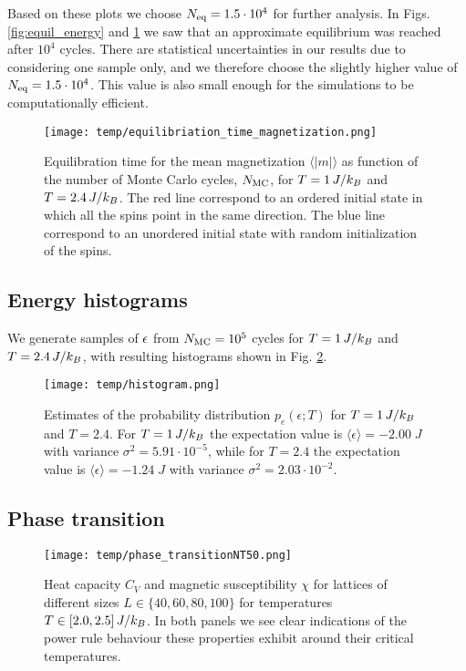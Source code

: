 Based on these plots we choose $N_\mathrm{eq}=1.5\cdot10^4$ for further analysis. In Figs. \ref{fig:equil_energy} and \ref{fig:equil_magn} we saw that an approximate equilibrium was reached after $10^4$ cycles. There are statistical uncertainties in our results due to considering one sample only, and we therefore choose the slightly higher value of $N_\mathrm{eq}=1.5\cdot10^4$. This value is also small enough for the simulations to be computationally efficient.

\begin{figure}[!ht]
    \texttt{[image: temp/equilibriation\_time\_magnetization.png]}
    \caption{Equilibration time for the mean magnetization $\langle \vert m \vert \rangle$ as function of the number of Monte Carlo cycles, $N_\mathrm{MC}$, for $T=1\,J/k_B$ and $T=2.4\,J/k_B$. The red line correspond to an ordered initial state in which all the spins point in the same direction. The blue line correspond to an unordered initial state with random initialization of the spins.}
    \label{fig:equil_magn}
\end{figure}

\subsection{Energy histograms}\label{subsec_results:histogram}
We generate samples of $\epsilon$ from $N_\mathrm{MC}=10^5$ cycles for $T=1\,J/k_B$ and $T=2.4\,J/k_B$, with resulting histograms shown in Fig. \ref{fig:histogram}.  
\begin{figure}[!ht]
    \texttt{[image: temp/histogram.png]}
    \caption{Estimates of the probability distribution $p_e(\epsilon; T)$ for $T=1\,J/k_B$ and $T=2.4$. For $T=1\,J/k_B$ the expectation value is $\langle \epsilon \rangle = -2.00 \; J$ with variance $\sigma^2 = 5.91\cdot 10^{-5}$, while for $T=2.4$ the expectation value is $\langle \epsilon \rangle = -1.24 \; J$ with variance $\sigma^2=2.03\cdot 10^{-2}$.}
    \label{fig:histogram}
\end{figure}

\subsection{Phase transition}\label{subsec_results:phase_transition}
\begin{figure*}[!ht]
    \texttt{[image: temp/phase\_transitionNT50.png]} 
    \caption{Heat capacity $C_V$ and magnetic susceptibility $\chi$ for lattices of different sizes $L\in\{40,60,80,100\}$ for temperatures $T\in[2.0,2.5]\,J/k_B$. In both panels we see clear indications of the power rule behaviour these properties exhibit around their critical temperatures.}
    \label{fig:phase_transition}
\end{figure*} 

